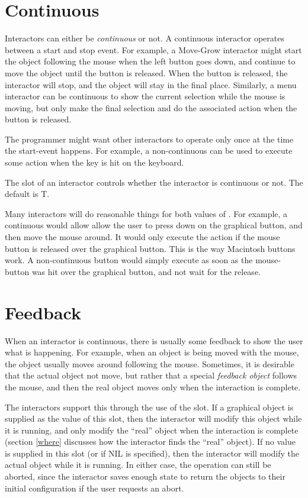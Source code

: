 \section{Continuous}
\label{continuous}
Interactors can either be {\it continuous} or not.  A continuous interactor
operates between a start and stop event.  For example, a Move-Grow interactor
might start the object following the mouse when the left button goes down,
and continue to move the object until the button is released.  When the
button is released, the interactor will stop, and the object will stay in
the final place.  Similarly, a menu interactor can be continuous to show
the current selection while the mouse is moving, but only make the final
selection and do the associated action when the button is released.

The programmer might want other interactors to operate only once at the time the
start-event happens.
For example, a non-continuous  can be used to
execute some action when the  key is hit on the keyboard.

The  slot of an interactor controls whether the interactor
is continuous or not.  The default is T.

Many interactors will do reasonable things for both values of
.  For example, a continuous  would
allow allow the user to press down on the graphical button, and then move
the mouse around.  It would only execute the action if the mouse button is
released over the graphical button.  This is the way Macintosh buttons
work.  A non-continuous button would simply execute as soon as the
mouse-button was hit over the graphical button, and not wait for the release.

\section{Feedback}

When an interactor is continuous, there is usually some feedback to show
the user what is happening.  For example, when an object is being moved
with the mouse, the object usually moves around following the mouse.
Sometimes, it is desirable that the actual object not move, but rather
that a special {\it feedback object} follows the mouse, and then the real
object moves only when the interaction is complete.


The interactors support this through the use of the 
slot.  If a graphical object is supplied as the value of this slot, then
the interactor will modify this object while it is running, and only modify
the ``real'' object when the interaction is complete (section \ref{where}
discusses how the interactor finds the ``real'' object).  If no value is
supplied in this slot (or if NIL is specified), then the interactor will
modify the actual object while it is running.  In either case, the
operation can still be aborted, since the interactor saves enough state to
return the objects to their initial configuration if the user requests an
abort.

